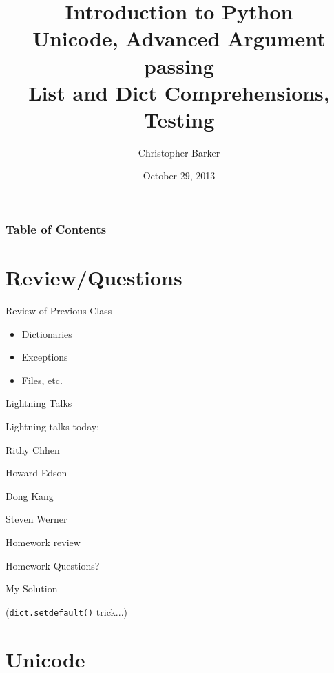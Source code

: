 \documentclass{beamer}
\title[Intro to Python: Week 1]{Introduction  to Python\\
Unicode, Advanced Argument passing\\
List and Dict Comprehensions, Testing
}
\author{Christopher Barker}
\institute{UW Continuing Education}
\date{October 29, 2013}
\begin{document}
\begin{frame}
  \titlepage
\end{frame}

\begin{frame}
\frametitle{Table of Contents}
  \tableofcontents
\end{frame}


\section{Review/Questions}

\begin{frame}{Review of Previous Class}

\begin{itemize}
  \item Dictionaries
  \item Exceptions
  \item Files, etc.
\end{itemize}

\end{frame}


\begin{frame}{Lightning Talks}

\vfill
{\LARGE Lightning talks today:}

\vfill
{\Large
Rithy Chhen

\vfill
Howard Edson

\vfill
Dong Kang

\vfill
Steven Werner

}
\vfill

\end{frame}


\begin{frame}[fragile]{Homework review}

  \vfill
  {\Large Homework Questions? }

  \vfill
  {\Large My Solution}

  (\verb|dict.setdefault()| trick...)

  \vfill
\end{frame}

\section{Unicode}
\end{document}
